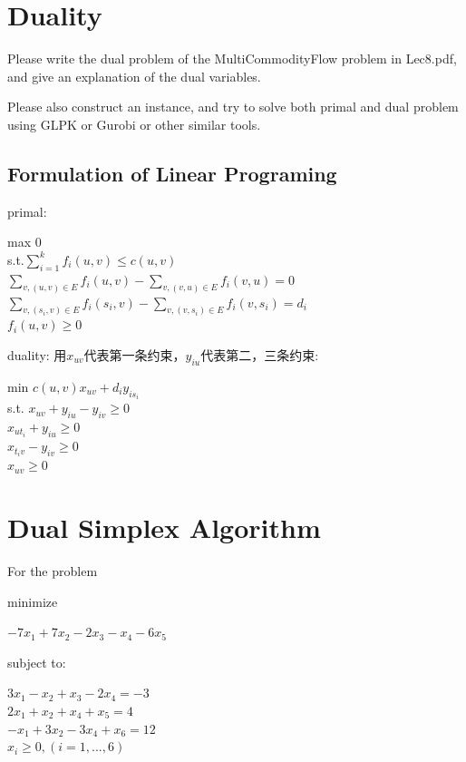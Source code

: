 \documentclass{article}
\begin{document}
\newpage
\section{Duality}
Please write the dual problem of the MultiCommodityFlow problem in Lec8.pdf, and give an explanation of the dual variables. 

Please also construct an instance, and try to solve both primal and dual problem using GLPK or Gurobi or other similar tools.



\subsection{Formulation of Linear Programing}

primal:

\begin{center}
max 0\\
s.t.$\sum_{i=1}^kf_i(u,v) \leq c(u,v)$ \\
$\sum_{v,(u,v)\in E}f_i(u,v) - \sum_{v,(v,u)\in E}f_i(v,u)=0$\\
$\sum_{v,(s_i,v)\in E}f_i(s_i,v) - \sum_{v,(v,s_i)\in E}f_i(v,s_i)=d_i$\\
$f_i(u,v) \geq 0$
\end{center} 

duality:
用$x_{uv}$代表第一条约束，$y_{iu}$代表第二，三条约束:
\begin{center}
min $ c(u,v)x_{uv}+d_iy_{is_i}$\\
s.t. $x_{uv}+y_{iu}-y_{iv} \geq 0$\\
$x_{ut_i}+y_{iu} \geq 0$\\
$x_{t_iv}-y_{iv} \geq 0$\\
$x_{uv} \geq 0$
\end{center} 


\newpage
\section{Dual Simplex Algorithm}
For the problem

minimize

\begin{center} 
$-7x_1 + 7x_2 - 2x_3 - x_4 - 6x_5$
\end{center}

subject to:

\begin{center}
$3x_1 - x_2 + x_3 - 2x_4 = -3$ \\ 
$2x_1 + x_2 + x_4 + x_5 = 4$ \\
$- x_1 + 3x_2 - 3x_4 + x_6 = 12$ \\
$x_i \geq 0,(i = 1,...,6)$
\end{center}
\end{document}
